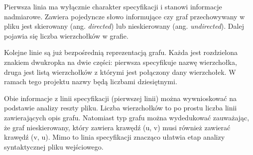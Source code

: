 Pierwsza linia ma wyłącznie charakter specyfikacji i stanowi informacje nadmiarowe.
Zawiera pojedyncze słowo informujące czy graf przechowywany w pliku jest skierowany (ang. \textit{directed}) lub nieskierowany (ang. \textit{undirected}). 
Dalej pojawia się liczba wierzchołków w grafie.

Kolejne linie są już bezpośrednią reprezentacją grafu.
Każda jest rozdzielona znakiem dwukropka na dwie części: pierwsza specyfikuje nazwę wierzchołka, druga jest listą wierzchołków z którymi jest połączony dany wierzchołek.
W ramach tego projektu nazwy będą liczbami dziesiętnymi.

Obie informacje z linii specyfikacji (pierwszej linii) można wywnioskować na podstawie analizy reszty pliku.
Liczba wierzchołków to po prostu liczba linii zawierających opis grafu.
Natomiast typ grafu można wydedukować zauważając, że graf nieskierowany, który zawiera krawędź (u, v) musi również zawierać krawędź (v, u).
Mimo to linia specyfikacji znacząco ułatwia etap analizy syntaktycznej pliku wejściowego.

